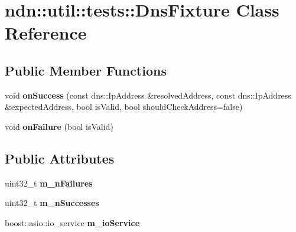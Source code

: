 \hypertarget{classndn_1_1util_1_1tests_1_1DnsFixture}{}\section{ndn\+:\+:util\+:\+:tests\+:\+:Dns\+Fixture Class Reference}
\label{classndn_1_1util_1_1tests_1_1DnsFixture}
\subsection*{Public Member Functions}
\begin{DoxyCompactItemize}
\item 
void {\bfseries on\+Success} (const dns\+::\+Ip\+Address \&resolved\+Address, const dns\+::\+Ip\+Address \&expected\+Address, bool is\+Valid, bool should\+Check\+Address=false)\hypertarget{classndn_1_1util_1_1tests_1_1DnsFixture_a69b0f156082e626a38e8bea266d37e19}{}\label{classndn_1_1util_1_1tests_1_1DnsFixture_a69b0f156082e626a38e8bea266d37e19}

\item 
void {\bfseries on\+Failure} (bool is\+Valid)\hypertarget{classndn_1_1util_1_1tests_1_1DnsFixture_aaf21405e58972b87065d94804548a40a}{}\label{classndn_1_1util_1_1tests_1_1DnsFixture_aaf21405e58972b87065d94804548a40a}

\end{DoxyCompactItemize}
\subsection*{Public Attributes}
\begin{DoxyCompactItemize}
\item 
uint32\+\_\+t {\bfseries m\+\_\+n\+Failures}\hypertarget{classndn_1_1util_1_1tests_1_1DnsFixture_a4d4a721a9cbfe17b74b9da30602255eb}{}\label{classndn_1_1util_1_1tests_1_1DnsFixture_a4d4a721a9cbfe17b74b9da30602255eb}

\item 
uint32\+\_\+t {\bfseries m\+\_\+n\+Successes}\hypertarget{classndn_1_1util_1_1tests_1_1DnsFixture_ab8ddf57c1008f7551a0a06f8f57f1540}{}\label{classndn_1_1util_1_1tests_1_1DnsFixture_ab8ddf57c1008f7551a0a06f8f57f1540}

\item 
boost\+::asio\+::io\+\_\+service {\bfseries m\+\_\+io\+Service}\hypertarget{classndn_1_1util_1_1tests_1_1DnsFixture_a9a43f5bb4d056692461945c157e94e33}{}\label{classndn_1_1util_1_1tests_1_1DnsFixture_a9a43f5bb4d056692461945c157e94e33}

\end{DoxyCompactItemize}


